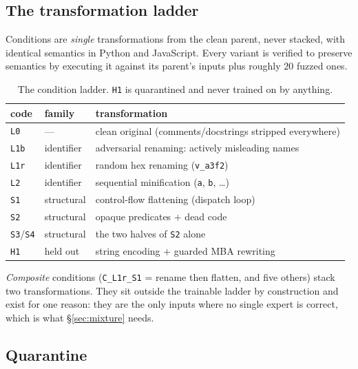 \documentclass[sigconf,review,anonymous]{acmart}
\newcommand{\cond}[1]{\texttt{#1}}
\begin{document}
\subsection{The transformation ladder}

Conditions are \emph{single} transformations from the clean parent, never stacked, with
identical semantics in Python and JavaScript. Every variant is verified to preserve semantics by
executing it against its parent's inputs plus roughly $20$ fuzzed ones.

\begin{table}[t]
\caption{The condition ladder. \cond{H1} is quarantined and never trained on by anything.}
\label{tab:conditions}
\small
\begin{tabular}{@{}llp{4.6cm}@{}}
\toprule
code & family & transformation \\
\midrule
\cond{L0}  & ---        & clean original (comments/docstrings stripped everywhere) \\
\cond{L1b} & identifier & adversarial renaming: actively misleading names \\
\cond{L1r} & identifier & random hex renaming (\texttt{v\_a3f2}) \\
\cond{L2}  & identifier & sequential minification (\texttt{a}, \texttt{b}, \dots) \\
\cond{S1}  & structural & control-flow flattening (dispatch loop) \\
\cond{S2}  & structural & opaque predicates $+$ dead code \\
\cond{S3}/\cond{S4} & structural & the two halves of \cond{S2} alone \\
\midrule
\cond{H1}  & held out   & string encoding $+$ guarded MBA rewriting \\
\bottomrule
\end{tabular}
\end{table}

\emph{Composite} conditions (\cond{C\_L1r\_S1} = rename then flatten, and five others) stack two
transformations. They sit outside the trainable ladder by construction and exist for one
reason: they are the only inputs where no single expert is correct, which is what
\S\ref{sec:mixture} needs.

\subsection{Quarantine}
\label{sec:quarantine}
\end{document}
